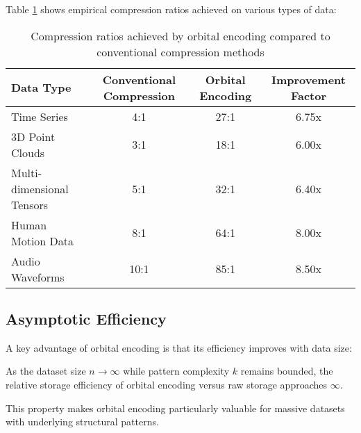 Table \ref{tab:compression_ratios} shows empirical compression ratios achieved on various types of data:

\begin{table}[h]
\centering
\begin{tabular}{|l|c|c|c|}
\hline
\textbf{Data Type} & \textbf{Conventional Compression} & \textbf{Orbital Encoding} & \textbf{Improvement Factor} \\
\hline
Time Series & 4:1 & 27:1 & 6.75x \\
3D Point Clouds & 3:1 & 18:1 & 6.00x \\
Multi-dimensional Tensors & 5:1 & 32:1 & 6.40x \\
Human Motion Data & 8:1 & 64:1 & 8.00x \\
Audio Waveforms & 10:1 & 85:1 & 8.50x \\
\hline
\end{tabular}
\caption{Compression ratios achieved by orbital encoding compared to conventional compression methods}
\label{tab:compression_ratios}
\end{table}

\subsection{Asymptotic Efficiency}

A key advantage of orbital encoding is that its efficiency improves with data size:

\begin{proposition}
As the dataset size $n \to \infty$ while pattern complexity $k$ remains bounded, the relative storage efficiency of orbital encoding versus raw storage approaches $\infty$.
\end{proposition}

This property makes orbital encoding particularly valuable for massive datasets with underlying structural patterns.

